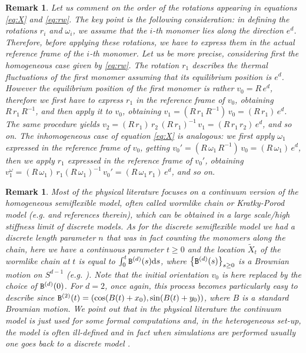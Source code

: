 \documentclass[a4paper,reqno,11pt]{amsart}
\numberwithin{equation}{section}
\newtheorem{rem}[theorem]{Remark}
\newcommand{\go}{\omega}
\renewcommand{\tilde}{\widetilde}          %
\newcommand{\dd}{\text{\rm d}}             %
\begin{document}

\medskip

\begin{rem}\label{rem:order} \rm
Let us comment on the order of the rotations appearing in equations \eqref{eq:X}
and \eqref{eq:rw}. The key point is the following consideration:
in defining the rotations $r_i$ and $\omega_i$, we assume that the
$i$-th monomer lies along the direction $e^d$. Therefore, before applying
these rotations, we have to express them in the actual reference frame of
the $i$-th monomer. 
Let us be more precise, considering first
the homogeneous case given by \eqref{eq:rw}.
The rotation $r_1$ describes the thermal
fluctuations of the first monomer {\sl assuming that its equilibrium position is $e^d$}.
However the equilibrium position of the first monomer is rather $v_0 = R\, e^d$, therefore
we first have to express $r_1$ in the reference frame of $v_0$,
obtaining $R \, r_1 \, R^{-1}$, and then apply it to $v_0$, obtaining
$v_1 = (R \, r_1 \, R^{-1})\, v_0 = (R \, r_1) \, e^d$. The same procedure
yields $v_2 = (R \, r_1) \, r_2 \, (R \, r_1)^{-1} \, v_1 = (R \, r_1 \, r_2) \, e^d$,
and so on. The inhomogeneous case of equation \eqref{eq:X} is analogous:
we first apply $\go_1$ expressed in the reference frame of $v_0$, getting
$v_0' = (R \, \go_1 \, R^{-1}) \, v_0 = (R \, \go_1) \, e^d$, then we apply
$r_1$ expressed in the reference frame of $v_0'$, obtaining
$v_1^\go = (R \, \go_1) \, r_1 (R \, \go_1)^{-1} \, v_0' = (R \, \go_1 \, r_1) \, e^d$,
and so on.
\end{rem}
 

\smallskip 


\begin{rem}\label{rem:continuum}
\rm
Most of the physical literature focuses 
on 
a continuum version of the homogeneous 
semiflexible model, often called {\sl wormlike chain}  or {\sl Kratky-Porod} model
({\sl e.g.} \cite{cf:WN} and references therein),
which can be  obtained in a large scale/high stiffness limit
of discrete models.
As for the discrete semiflexible model we had a discrete length parameter
$n$ that was in fact counting the monomers along the chain, here we have 
a continuous parameter $t\ge 0$ and the location $\tilde X_t$ of 
the wormlike chain at $t$ is equal to 
$\int_{0}^t {\tt B}^{(d)}(s) \dd s$,
where $\left\{ {\tt B}^{(d)}(s)\right\}_{s\ge 0}$
is a Brownian motion on $S^{d-1}$ ({\sl e.g.} \cite{cf:RW}). Note that 
the initial orientation $v_0$ is here replaced by the choice of ${\tt B}^{(d)}(0)$.
For $d=2$, once again, this process becomes particularly 
easy to describe since ${\tt B}^{(2)}(t)= 
(\cos (B(t)+x_0), \sin(B(t)+y_0) )$,
where $B$ is a standard Brownian motion.
We point out that in the physical literature the continuum model is just used
for some {\sl formal} computations and, in the heterogeneous set-up, the model
is often ill-defined and in fact when simulations are performed usually one
goes back to a discrete model \cite{cf:BDM,cf:MN,cf:Vaillant,cf:WN,cf:ZC}.   
\end{rem}
\end{document}
